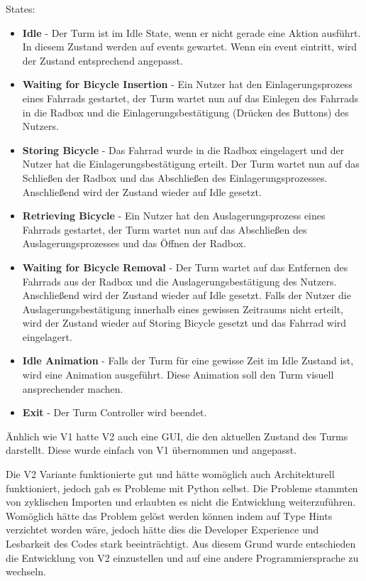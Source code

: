 States:
\begin{itemize}
  \item \textbf{Idle} - Der Turm ist im Idle State, wenn er nicht gerade eine Aktion ausführt. In diesem Zustand werden auf \Glspl{event} gewartet. Wenn ein \Gls{event} eintritt, wird der Zustand entsprechend angepasst.
  \item \textbf{Waiting for Bicycle Insertion} - Ein Nutzer hat den Einlagerungsprozess eines Fahrrads gestartet, der Turm wartet nun auf das Einlegen des Fahrrads in die Radbox und die Einlagerungsbestätigung (Drücken des Buttons) des Nutzers.
  \item \textbf{Storing Bicycle} - Das Fahrrad wurde in die Radbox eingelagert und der Nutzer hat die Einlagerungsbestätigung erteilt. Der Turm wartet nun auf das Schließen der Radbox und das Abschließen des Einlagerungsprozesses. Anschließend wird der Zustand wieder auf Idle gesetzt.
  \item \textbf{Retrieving Bicycle} - Ein Nutzer hat den Auslagerungsprozess eines Fahrrads gestartet, der Turm wartet nun auf das Abschließen des Auslagerungsprozesses und das Öffnen der Radbox.
  \item \textbf{Waiting for Bicycle Removal} - Der Turm wartet auf das Entfernen des Fahrrads aus der Radbox und die Auslagerungsbestätigung des Nutzers. Anschließend wird der Zustand wieder auf Idle gesetzt. Falls der Nutzer die Auslagerungsbestätigung innerhalb eines gewissen Zeitraums nicht erteilt, wird der Zustand wieder auf Storing Bicycle gesetzt und das Fahrrad wird eingelagert.
  \item \textbf{Idle Animation} - Falls der Turm für eine gewisse Zeit im Idle Zustand ist, wird eine Animation ausgeführt. Diese Animation soll den Turm visuell ansprechender machen.
  \item \textbf{Exit} - Der Turm Controller wird beendet.
\end{itemize}

Änhlich wie V1 hatte V2 auch eine \ac{GUI}, die den aktuellen Zustand des Turms darstellt. Diese wurde einfach von V1 übernommen und angepasst.

Die V2 Variante funktionierte gut und hätte womöglich auch Architekturell funktioniert, jedoch gab es Probleme mit Python selbst. Die Probleme stammten von zyklischen Importen und erlaubten es nicht die Entwicklung weiterzuführen. Womöglich hätte das Problem gelöst werden können indem auf Type Hints verzichtet worden wäre, jedoch hätte dies die Developer Experience und Lesbarkeit des Codes stark beeinträchtigt. Aus diesem Grund wurde entschieden die Entwicklung von V2 einzustellen und auf eine andere Programmiersprache zu wechseln.